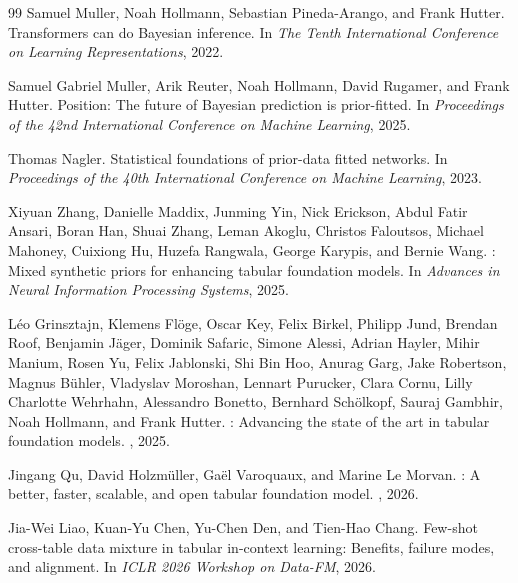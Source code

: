 \documentclass{article}
\theoremstyle{definition}
\theoremstyle{remark}
\begin{document}
\begin{thebibliography}{99}
Samuel Muller, Noah Hollmann, Sebastian Pineda-Arango, and Frank Hutter.
\newblock Transformers can do {B}ayesian inference.
\newblock In {\em The Tenth International Conference on Learning Representations}, 2022.

Samuel Gabriel Muller, Arik Reuter, Noah Hollmann, David Rugamer, and Frank Hutter.
\newblock Position: The future of {B}ayesian prediction is prior-fitted.
\newblock In {\em Proceedings of the 42nd International Conference on Machine Learning}, 2025.

Thomas Nagler.
\newblock Statistical foundations of prior-data fitted networks.
\newblock In {\em Proceedings of the 40th International Conference on Machine Learning}, 2023.

Xiyuan Zhang, Danielle Maddix, Junming Yin, Nick Erickson, Abdul Fatir Ansari, Boran Han, Shuai Zhang, Leman Akoglu, Christos Faloutsos, Michael Mahoney, Cuixiong Hu, Huzefa Rangwala, George Karypis, and Bernie Wang.
: Mixed synthetic priors for enhancing tabular foundation models.
\newblock In {\em Advances in Neural Information Processing Systems}, 2025.

L\'eo Grinsztajn, Klemens Fl\"oge, Oscar Key, Felix Birkel, Philipp Jund, Brendan Roof, Benjamin J\"ager, Dominik Safaric, Simone Alessi, Adrian Hayler, Mihir Manium, Rosen Yu, Felix Jablonski, Shi Bin Hoo, Anurag Garg, Jake Robertson, Magnus B\"uhler, Vladyslav Moroshan, Lennart Purucker, Clara Cornu, Lilly Charlotte Wehrhahn, Alessandro Bonetto, Bernhard Sch\"olkopf, Sauraj Gambhir, Noah Hollmann, and Frank Hutter.
: Advancing the state of the art in tabular foundation models.
, 2025.

Jingang Qu, David Holzm\"uller, Ga\"el Varoquaux, and Marine Le Morvan.
: A better, faster, scalable, and open tabular foundation model.
, 2026.

Jia-Wei Liao, Kuan-Yu Chen, Yu-Chen Den, and Tien-Hao Chang.
\newblock Few-shot cross-table data mixture in tabular in-context learning: Benefits, failure modes, and alignment.
\newblock In {\em ICLR 2026 Workshop on Data-FM}, 2026.

\end{thebibliography}
\end{document}
